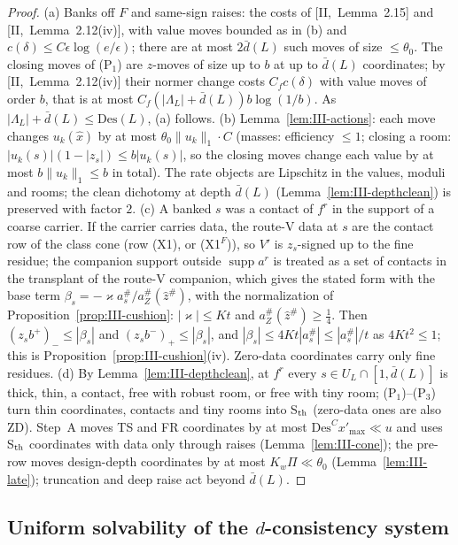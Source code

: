\documentclass[10pt]{amsart}
\theoremstyle{definition}
\theoremstyle{remark}
\newcommand{\supp}{\operatorname{supp}}
\newcommand{\zh}{\hat z}
\begin{document}
\begin{proof}
(a) Banks off $F$ and same-sign raises: the costs of [II,~Lemma~2.15] and
[II,~Lemma~2.12(iv)], with value moves bounded as in (b) and
$c(\delta)\le C\epsilon\log(e/\epsilon)$; there are at most $2\bar d(L)$ such
moves of size $\le\theta_0$.  The closing moves of (P$_1$) are $z$-moves of
size up to $b$ at up to $\bar d(L)$ coordinates; by [II,~Lemma~2.12(iv)] their
normer change costs $C_fc(\delta)$ with value moves of order $b$, that is at
most $C_f(|\Lambda_L|+\bar d(L))b\log(1/b)$.  As $|\Lambda_L|+\bar d(L)\le
\mathrm{Des}(L)$, (a) follows.  (b) Lemma~\ref{lem:III-actions}: each move
changes $u_k(\hat x)$ by at most $\theta_0\|u_k\|_1\cdot C$ (masses: efficiency
$\le1$; closing a room: $|u_k(s)|(1-|z_s|)\le b|u_k(s)|$, so the closing moves
change each value by at most $b\|u_k\|_1\le b$ in total).  The rate objects are
Lipschitz in the values, moduli and rooms; the clean dichotomy at depth
$\bar d(L)$ (Lemma~\ref{lem:III-depthclean}) is preserved with factor $2$.
(c) A banked $s$ was a contact of $f^r$ in the support of a coarse carrier.  If
the carrier carries data, the route-V data at $s$ are the contact row of the
class cone (row (X1), or (X1$^F$)), so $V'$ is $z_s$-signed up to the fine
residue; the companion support outside $\supp a^r$ is treated as a set of
contacts in the transplant of the route-V companion, which gives the stated
form with the base term $\beta_s=-\varkappa a^\#_s/a^\#_Z(\zh^\#)$, with the
normalization of Proposition~\ref{prop:III-cushion}: $|\varkappa|\le Kt$ and
$a^\#_Z(\zh^\#)\ge\frac14$.  Then $(z_sb^+)_-\le|\beta_s|$ and $(z_sb^-)_+\le
|\beta_s|$, and $|\beta_s|\le4Kt|a^\#_s|\le|a^\#_s|/t$ as $4Kt^2\le1$; this is
Proposition~\ref{prop:III-cushion}(iv).  Zero-data coordinates carry only
fine residues.  (d) By Lemma~\ref{lem:III-depthclean}, at $f^r$ every $s\in U_L\cap
[1,\bar d(L)]$ is thick, thin, a contact, free with robust room, or free with
tiny room; (P$_1$)--(P$_3$) turn thin coordinates, contacts and tiny rooms into
S$_{\rm th}$ (zero-data ones are also ZD).  Step~A moves TS and FR coordinates
by at most $\mathrm{Des}^Cx'_{\max}\ll u$ and uses S$_{\rm th}$ coordinates with
data only through raises (Lemma~\ref{lem:III-cone}); the pre-row moves
design-depth coordinates by at most $K_w\Pi\ll\theta_0$ (Lemma~\ref{lem:III-late});
truncation and deep raise act beyond $\bar d(L)$.
\end{proof}

\subsection{Uniform solvability of the $d$-consistency system}
\label{subsec:III-SysDC}
\end{document}
